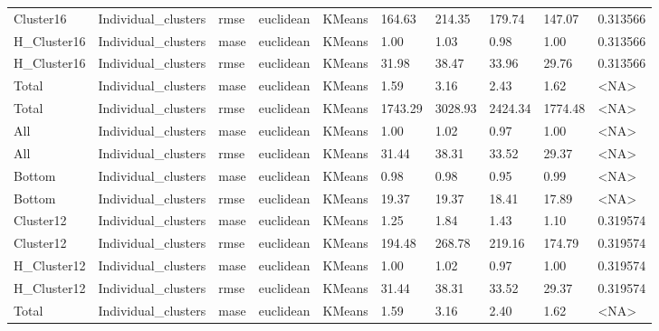 \begin{tabular}{llllllllll}
  Cluster16 & Individual\_clusters &   rmse &  euclidean &        KMeans &  164.63 &   214.35 &                179.74 &        147.07 &  0.313566 \\
H\_Cluster16 & Individual\_clusters &   mase &  euclidean &        KMeans &    1.00 &     1.03 &                  0.98 &          1.00 &  0.313566 \\
H\_Cluster16 & Individual\_clusters &   rmse &  euclidean &        KMeans &   31.98 &    38.47 &                 33.96 &         29.76 &  0.313566 \\
      Total & Individual\_clusters &   mase &  euclidean &        KMeans &    1.59 &     3.16 &                  2.43 &          1.62 &      <NA> \\
      Total & Individual\_clusters &   rmse &  euclidean &        KMeans & 1743.29 &  3028.93 &               2424.34 &       1774.48 &      <NA> \\
        All & Individual\_clusters &   mase &  euclidean &        KMeans &    1.00 &     1.02 &                  0.97 &          1.00 &      <NA> \\
        All & Individual\_clusters &   rmse &  euclidean &        KMeans &   31.44 &    38.31 &                 33.52 &         29.37 &      <NA> \\
     Bottom & Individual\_clusters &   mase &  euclidean &        KMeans &    0.98 &     0.98 &                  0.95 &          0.99 &      <NA> \\
     Bottom & Individual\_clusters &   rmse &  euclidean &        KMeans &   19.37 &    19.37 &                 18.41 &         17.89 &      <NA> \\
  Cluster12 & Individual\_clusters &   mase &  euclidean &        KMeans &    1.25 &     1.84 &                  1.43 &          1.10 &  0.319574 \\
  Cluster12 & Individual\_clusters &   rmse &  euclidean &        KMeans &  194.48 &   268.78 &                219.16 &        174.79 &  0.319574 \\
H\_Cluster12 & Individual\_clusters &   mase &  euclidean &        KMeans &    1.00 &     1.02 &                  0.97 &          1.00 &  0.319574 \\
H\_Cluster12 & Individual\_clusters &   rmse &  euclidean &        KMeans &   31.44 &    38.31 &                 33.52 &         29.37 &  0.319574 \\
      Total & Individual\_clusters &   mase &  euclidean &        KMeans &    1.59 &     3.16 &                  2.40 &          1.62 &      <NA> \\

\end{tabular}

